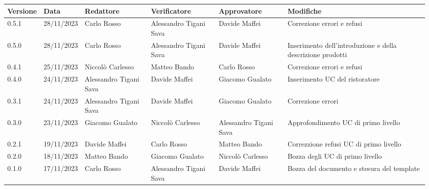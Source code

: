\begin{table}[H]
	\centering
	\fontsize{10}{12}\selectfont
	\begin{tabularx}{\textwidth}{X|X|X|X|X|X}
		\textbf{Versione}     & \textbf{Data}        & \textbf{Redattore}     &
		\textbf{Verificatore} & \textbf{Approvatore} & \textbf{Modifiche}                                                                                                    \\
		\toprule
		0.5.1                 & 28/11/2023           & Carlo Rosso            & Alessandro Tigani Sava & Davide Maffei          & Correzione errori e refusi                                 \\
		\hline
		0.5.0                 & 28/11/2023           & Carlo Rosso            & Alessandro Tigani Sava & Davide Maffei          & Inserimento dell'introduzione e della descrizione prodotti \\
		\hline
		0.4.1                 & 25/11/2023           & Niccolò Carlesso       & Matteo Bando           & Carlo Rosso            & Correzione errori e refusi                 \\
		\hline
		0.4.0                 & 24/11/2023           & Alessandro Tigani Sava & Davide Maffei          & Giacomo Gualato        & Inserimento UC del ristoratore             \\
		\hline
		0.3.1                 & 24/11/2023           & Alessandro Tigani Sava & Davide Maffei          & Giacomo Gualato        & Correzione errori                          \\
		\hline
		0.3.0                 & 23/11/2023           & Giacomo Gualato        & Niccolò Carlesso       & Alessandro Tigani Sava & Approfondimento UC di primo livello        \\
		\hline
		0.2.1                 & 19/11/2023           & Davide Maffei          & Carlo Rosso            & Matteo Bando           & Correzzione refusi UC di primo livello     \\
		\hline
		0.2.0                 & 18/11/2023           & Matteo Bando           & Giacomo Gualato        & Niccolò Carlesso       & Bozza degli UC di primo livello            \\
		\hline
		0.1.0                 & 17/11/2023           & Carlo Rosso            & Alessandro Tigani Sava & Davide Maffei          & Bozza del documento e stesura del template \\
		\bottomrule
	\end{tabularx}
\end{table}